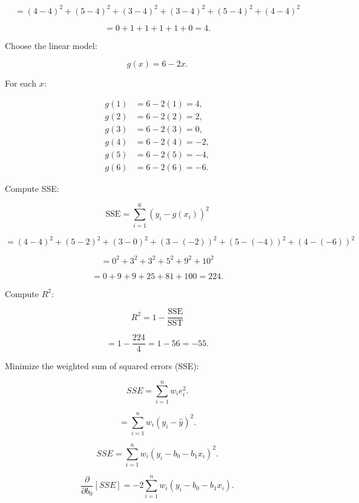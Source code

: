 \documentclass[12pt]{article}
\begin{document}
\begin{enumerate}
\[
= (4 - 4)^2 + (5 - 4)^2 + (3 - 4)^2 + (3 - 4)^2 + (5 - 4)^2 + (4 - 4)^2
\]

\[
= 0 + 1 + 1 + 1 + 1 + 0 = 4.
\]

Choose the linear model:

\[
g(x) = 6 - 2x.
\]

For each \( x \):

\[
\begin{aligned}
g(1) &= 6 - 2(1) = 4, \\
g(2) &= 6 - 2(2) = 2, \\
g(3) &= 6 - 2(3) = 0, \\
g(4) &= 6 - 2(4) = -2, \\
g(5) &= 6 - 2(5) = -4, \\
g(6) &= 6 - 2(6) = -6.
\end{aligned}
\]

Compute SSE:

\[
\text{SSE} = \sum_{i=1}^{6} (y_i - g(x_i))^2
\]

\[
= (4 - 4)^2 + (5 - 2)^2 + (3 - 0)^2 + (3 - (-2))^2 + (5 - (-4))^2 + (4 - (-6))^2
\]

\[
= 0^2 + 3^2 + 3^2 + 5^2 + 9^2 + 10^2
\]

\[
= 0 + 9 + 9 + 25 + 81 + 100 = 224.
\]

Compute \(R^2\):

\[
R^2 = 1 - \frac{\text{SSE}}{\text{SST}}
\]

\[
= 1 - \frac{224}{4} = 1 - 56 = -55.
\]



Minimize the weighted sum of squared errors (SSE):

\[
SSE = \sum_{i=1}^{n} w_i e_i^2.
\]

\[
= \sum_{i=1}^{n} w_i (y_i - \hat{y})^2.
\]

\[
SSE = \sum_{i=1}^{n} w_i (y_i - b_0 - b_1 x_i)^2.
\]



\[
\frac{\partial}{\partial b_0} [SSE] = -2 \sum_{i=1}^{n} w_i (y_i - b_0 - b_1 x_i).
\]


\end{enumerate}
\end{document}
